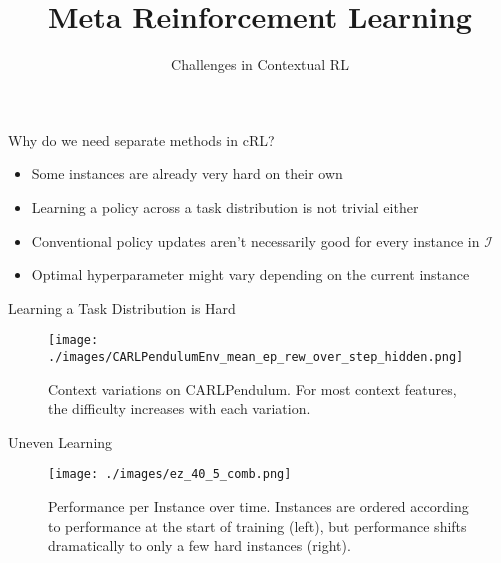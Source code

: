 \documentclass[aspectratio=169]{../latex_main/tntbeamer}  %
\title[Meta-RL]{Meta Reinforcement Learning}
\subtitle{Challenges in Contextual RL}
\begin{document}
	
	\maketitle


\begin{frame}[c]{Why do we need separate methods in cRL?}

\begin{itemize}
	\item Some instances are already very hard on their own
	\item Learning a policy across a task distribution is not trivial either
	\item Conventional policy updates aren't necessarily good for every instance in $\mathcal{I}$
	\item Optimal hyperparameter might vary depending on the current instance
\end{itemize}


\end{frame}
\begin{frame}[c]{Learning a Task Distribution is Hard}
	
\begin{figure}
    \centering
    \texttt{[image: ./images/CARLPendulumEnv\_mean\_ep\_rew\_over\_step\_hidden.png]}
    \caption{Context variations on CARLPendulum. For most context features, the difficulty increases with each variation.}
    \label{fig:my_label}
\end{figure}
	
\end{frame}
\begin{frame}[c]{Uneven Learning}
	
\begin{figure}
    \centering
    \texttt{[image: ./images/ez\_40\_5\_comb.png]}
    \caption{Performance per Instance over time. Instances are ordered according to performance at the start of training (left), but performance shifts dramatically to only a few hard instances (right).}
    \label{fig:my_label}
\end{figure}
	
\end{frame}
\end{document}
